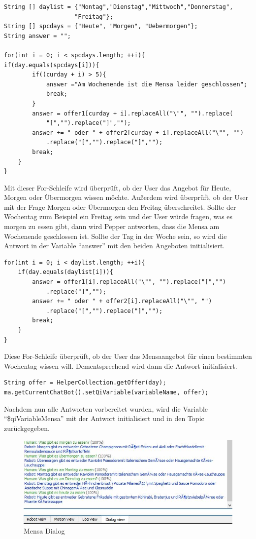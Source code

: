 \begin{lstlisting}
String [] daylist = {"Montag","Dienstag","Mittwoch","Donnerstag",
                    "Freitag"};
String [] spcdays = {"Heute", "Morgen", "Uebermorgen"};
String answer = "";

for(int i = 0; i < spcdays.length; ++i){
if(day.equals(spcdays[i])){
        if((curday + i) > 5){
            answer ="Am Wochenende ist die Mensa leider geschlossen";
            break;
        }
        answer = offer1[curday + i].replaceAll("\"", "").replace(
            "[","").replace("]","");
        answer += " oder " + offer2[curday + i].replaceAll("\"", "")
            .replace("[","").replace("]","");
        break;
    }
}    
\end{lstlisting}

Mit dieser For-Schleife wird überprüft, ob der User das Angebot für Heute, Morgen oder Übermorgen wissen möchte. Außerdem wird 
überprüft, ob der User mit der Frage Morgen oder Übermorgen den Freitag überschreitet. Sollte der Wochentag zum Beispiel ein Freitag 
sein und der User würde fragen, was es morgen zu essen gibt, dann wird Pepper antworten, dass die Mensa am Wochenende geschlossen 
ist. Sollte der Tag in der Woche sein, so wird die Antwort in der Variable ``answer'' mit den beiden Angeboten initialisiert. 

\begin{lstlisting}
for(int i = 0; i < daylist.length; ++i){
    if(day.equals(daylist[i])){
        answer = offer1[i].replaceAll("\"", "").replace("[","")
            .replace("]","");
        answer += " oder " + offer2[i].replaceAll("\"", "")
            .replace("[","").replace("]","");
        break;
    }
}
\end{lstlisting}

Diese For-Schleife überprüft, ob der User das Mensaangebot für einen bestimmten Wochentag wissen will. Dementsprechend wird dann die 
Antwort initialisiert.

\begin{lstlisting}
String offer = HelperCollection.getOffer(day);
ma.getCurrentChatBot().setQiVariable(variableName, offer);    
\end{lstlisting}

Nachdem nun alle Antworten vorbereitet wurden, wird die Variable “\$qiVariableMensa” mit der Antwort initialisiert und in den Topic 
zurückgegeben. 

\begin{figure}[H]
    \centering
    \includegraphics[width=\textwidth]{Figures/AppChapter/mensa_6.JPG}
    \caption{Mensa Dialog}
    \label{fig:mensadialog}
    \centering
\end{figure}


